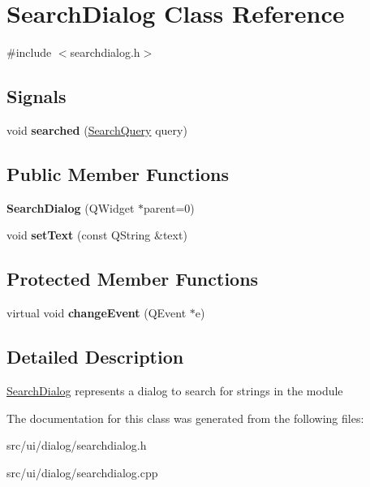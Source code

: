 \hypertarget{classSearchDialog}{
\section{SearchDialog Class Reference}
\label{classSearchDialog}
}


{\ttfamily \#include $<$searchdialog.h$>$}\subsection*{Signals}
\begin{DoxyCompactItemize}
\item 
\hypertarget{classSearchDialog_a905b1777406bcdee448b1a8e2e3950e7}{
void {\bfseries searched} (\hyperlink{classSearchQuery}{SearchQuery} query)}
\label{classSearchDialog_a905b1777406bcdee448b1a8e2e3950e7}

\end{DoxyCompactItemize}
\subsection*{Public Member Functions}
\begin{DoxyCompactItemize}
\item 
\hypertarget{classSearchDialog_a65ff3c491f44bdba0894e9661ad4335d}{
{\bfseries SearchDialog} (QWidget $\ast$parent=0)}
\label{classSearchDialog_a65ff3c491f44bdba0894e9661ad4335d}

\item 
\hypertarget{classSearchDialog_a41694fcd52d8f21f0e7259cab44a60b0}{
void {\bfseries setText} (const QString \&text)}
\label{classSearchDialog_a41694fcd52d8f21f0e7259cab44a60b0}

\end{DoxyCompactItemize}
\subsection*{Protected Member Functions}
\begin{DoxyCompactItemize}
\item 
\hypertarget{classSearchDialog_a58fdc61fba05c488cb163788cd40a405}{
virtual void {\bfseries changeEvent} (QEvent $\ast$e)}
\label{classSearchDialog_a58fdc61fba05c488cb163788cd40a405}

\end{DoxyCompactItemize}


\subsection{Detailed Description}
\hyperlink{classSearchDialog}{SearchDialog} represents a dialog to search for strings in the module 

The documentation for this class was generated from the following files:\begin{DoxyCompactItemize}
\item 
src/ui/dialog/searchdialog.h\item 
src/ui/dialog/searchdialog.cpp\end{DoxyCompactItemize}
